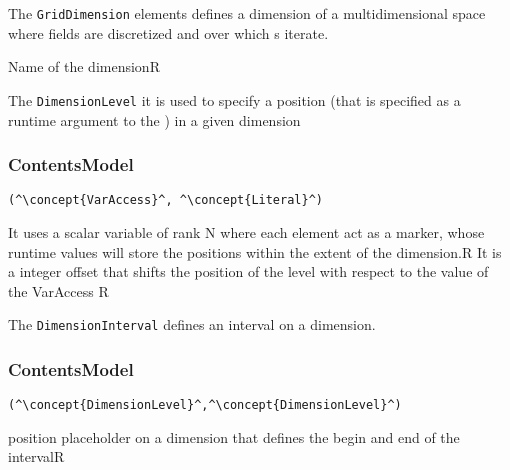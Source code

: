 
The {\tt GridDimension} elements defines a dimension of a multidimensional space where fields are discretized and over which s iterate.

\HIRContentsModel{ () }
\begin{HIRAttributes}
	{Name of the dimension}{R}
\end{HIRAttributes}


The {\tt DimensionLevel} it is used to specify a position (that is specified as a runtime argument to the ) in a given dimension

\subsubsection*{ContentsModel}{}

\begin{lstlisting}[style=default,frame=none]
(^\concept{VarAccess}^, ^\concept{Literal}^)
\end{lstlisting}

\begin{HIRChildElements}
	{It uses a scalar variable of rank N where each element act as a marker, whose runtime values will store the positions within the extent of the dimension.}{R}
	{It is a integer offset that shifts the position of the level with respect to the value of the VarAccess }{R}
\end{HIRChildElements}


The {\tt DimensionInterval} defines an interval on a dimension.

\subsubsection*{ContentsModel}{}

\begin{lstlisting}[style=default,frame=none]
(^\concept{DimensionLevel}^,^\concept{DimensionLevel}^)
\end{lstlisting}

\begin{HIRChildElements}
	{position placeholder on a dimension that defines the begin and end of the interval}{R}
\end{HIRChildElements}

